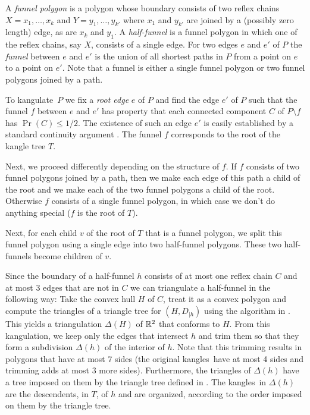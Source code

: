\documentclass[charterfonts,lotsofwhite]{patmorin}
\newcommand{\kangles}{kangles}
\newcommand{\kangulation}{kangulation}
\newcommand{\kangulate}{kangulate}
\begin{document}
A \emph{funnel polygon} is a polygon whose boundary consists of two
reflex chains $X=x_1,\ldots,x_k$ and $Y=y_1,\ldots,y_{k'}$ where $x_1$
and $y_{k'}$ are joined by a (possibly zero length) edge, as are $x_k$
and $y_{1}$.  A \emph{half-funnel} is a funnel polygon in which one of
the reflex chains, say $X$, consists of a single edge.  For two edges
$e$ and $e'$ of $P$ the \emph{funnel} between $e$ and $e'$ is the
union of all shortest paths in $P$ from a point on $e$ to a point on
$e'$.  Note that a funnel is either a single funnel polygon or two
funnel polygons joined by a path.

To \kangulate\ $P$ we fix a \emph{root edge} $e$ of $P$ and find the
edge $e'$ of $P$ such that the funnel $f$ between $e$ and $e'$ has
property that each connected component $C$ of $P\setminus f$ has
$\Pr(C)\le 1/2$. The existence of such an edge $e'$ is easily
established by a standard continuity argument \cite{geoham}.  The
funnel $f$ corresponds to the root of the kangle tree $T$.

Next, we proceed differently depending on the structure of $f$.  If
$f$ consists of two funnel polygons joined by a path, then we make
each edge of this path a child of the root and we make each of the two
funnel polygons a child of the root.  Otherwise $f$ consists of a
single funnel polygon, in which case we don't do anything special ($f$
is the root of $T$).

Next, for each child $v$ of the root of $T$ that is a funnel polygon,
we split this funnel polygon using a single edge into two half-funnel
polygons.  These two half-funnels become children of $v$.

Since the boundary of a half-funnel $h$ consists of at most one reflex
chain $C$ and at most 3 edges that are not in $C$  we can triangulate
a half-funnel in the following way:  Take the convex hull $H$ of $C$,
treat it as a convex polygon and compute the triangles of a triangle
tree for $(H,D_{\mid h})$ using the algorithm in .
This yields a triangulation $\Delta(H)$ of $\mathbb{R}^2$ that conforms to
$H$.  From this \kangulation, we keep only the edges that intersect
$h$ and trim them so that they form a subdivision $\Delta(h)$ of the
interior of $h$. Note that this trimming results in polygons that have
at most 7 sides (the original \kangles\ have at most 4 sides and
trimming adds at most 3 more sides).  Furthermore, the triangles of
$\Delta(h)$ have a tree imposed on them by the triangle tree defined
in .  The \kangles\ in $\Delta(h)$ are the descendents,
in $T$, of $h$ and are organized, according to the order imposed on
them by the triangle tree.
\end{document}
